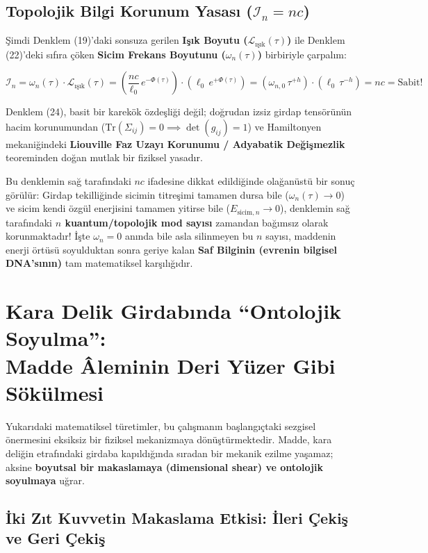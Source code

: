 \documentclass[12pt,a4paper]{article}
\begin{document}
\subsection{Topolojik Bilgi Korunum Yasası ($\mathcal{I}_n = n c$)}

Şimdi Denklem (19)'daki sonsuza gerilen \textbf{Işık Boyutu ($\mathcal{L}_{\text{ışık}}(\tau)$)} ile Denklem (22)'deki sıfıra çöken \textbf{Sicim Frekans Boyutunu ($\omega_n(\tau)$)} birbiriyle çarpalım:

\begin{equation}
\mathcal{I}_n = \omega_n(\tau) \cdot \mathcal{L}_{\text{ışık}}(\tau) = \left( \frac{n c}{\ell_0} \, e^{-\Phi(\tau)} \right) \cdot \left( \ell_0 \, e^{+\Phi(\tau)} \right) = \left( \omega_{n,0} \, \tau^{+h} \right) \cdot \left( \ell_0 \, \tau^{-h} \right) = n c = \text{Sabit!}
\end{equation}

Denklem (24), basit bir karekök özdeşliği değil; doğrudan izsiz girdap tensörünün hacim korunumundan ($\text{Tr}(\Sigma_{ij}) = 0 \implies \det(g_{ij}) = 1$) ve Hamiltonyen mekaniğindeki \textbf{Liouville Faz Uzayı Korunumu / Adyabatik Değişmezlik} teoreminden doğan mutlak bir fiziksel yasadır.

Bu denklemin sağ tarafındaki $n c$ ifadesine dikkat edildiğinde olağanüstü bir sonuç görülür: Girdap tekilliğinde sicimin titreşimi tamamen dursa bile ($\omega_n(\tau) \to 0$) ve sicim kendi özgül enerjisini tamamen yitirse bile ($E_{\text{sicim}, n} \to 0$), denklemin sağ tarafındaki \textbf{$n$ kuantum/topolojik mod sayısı} zamandan bağımsız olarak korunmaktadır! İşte $\omega_n = 0$ anında bile asla silinmeyen bu $n$ sayısı, maddenin enerji örtüsü soyulduktan sonra geriye kalan \textbf{Saf Bilginin (evrenin bilgisel DNA'sının)} tam matematiksel karşılığıdır.

\section{Kara Delik Girdabında ``Ontolojik Soyulma'':\\ Madde Âleminin Deri Yüzer Gibi Sökülmesi}

Yukarıdaki matematiksel türetimler, bu çalışmanın başlangıçtaki sezgisel önermesini eksiksiz bir fiziksel mekanizmaya dönüştürmektedir. Madde, kara deliğin etrafındaki girdaba kapıldığında sıradan bir mekanik ezilme yaşamaz; aksine \textbf{boyutsal bir makaslamaya (dimensional shear) ve ontolojik soyulmaya} uğrar.

\subsection{İki Zıt Kuvvetin Makaslama Etkisi: İleri Çekiş ve Geri Çekiş}
\end{document}
